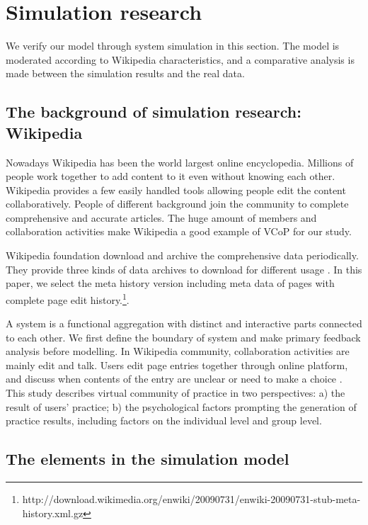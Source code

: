 \documentclass[doublespacing]{elsarticle}
\begin{document}
\section{Simulation research }
\label{sec:simulation-research-}

 We  verify our model through system simulation in this section. The model
 is moderated according to
    Wikipedia characteristics, and  a comparative
    analysis is made between the simulation results and the real
    data. 

\subsection{The background of simulation research: Wikipedia}
\label{sec:backgr-simul-rese}
Nowadays Wikipedia has been the world largest online
encyclopedia. Millions of people work together to add content to it
even without knowing each other. Wikipedia provides a few easily
handled tools allowing people edit the content collaboratively. People
of different background join the community to complete comprehensive
and accurate articles. The huge amount of  members and collaboration
activities make Wikipedia  a good example of VCoP
for our study. 
 


Wikipedia foundation download and archive the comprehensive data
periodically.  They provide three  kinds of  data archives to download
for different usage . In this paper, we select the meta history version including  meta
data of pages with complete page edit history.\footnote{http://download.wikimedia.org/enwiki/20090731/enwiki-20090731-stub-meta-history.xml.gz}.
   

A system is a functional aggregation with distinct and interactive
parts connected to each other. We  first define the boundary of
system and make primary feedback analysis before modelling. In
Wikipedia community, collaboration activities are mainly edit and
talk. Users edit page entries together through online platform,
and discuss when contents of the entry are unclear or need to make a choice . This
study describes virtual community of practice in two perspectives: a)
the result of users' practice; b) the psychological factors prompting
the generation of practice results, including factors on the
individual level and group level.

\subsection{The elements in the simulation model
}
\label{sec:defin-fact-wiki}
\end{document}
